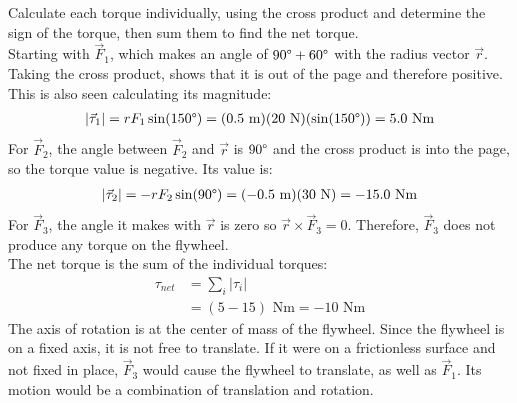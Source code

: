\documentclass[a4paper]{article}
\newcommand\m{\text{ m}}
\newcommand\Nm{\text{ Nm}}
\begin{document}
\begin{shaded}
\begin{center}
    \end{center}
    Calculate each torque individually, using the cross product and determine the sign of the torque, then sum them to find the net torque.
    \vspace{1mm}\\
    Starting with $\vec{F}_1$, which makes an angle of $90\degree + 60\degree$ with the radius vector $\vec{r}$. Taking the cross product, shows that it is out of the page and therefore positive. This is also seen calculating its magnitude:
    \begin{align*}
        |\vec{\tau}_1| = rF_1\sin(150\degree) = (0.5\m)(20\text{ N})(\sin(150\degree)) = 5.0\Nm
    \end{align*}
    For $\vec{F}_2$, the angle between $\vec{F}_2$ and $\vec{r}$ is $90\degree$ and the cross product is into the page, so the torque value is negative. Its value is:
    \begin{align*}
        |\vec{\tau}_2| = -rF_2\sin(90\degree) = (-0.5\m)(30\text{ N}) = -15.0\Nm
    \end{align*}
    For $\vec{F}_3$, the angle it makes with $\vec{r}$ is zero so $\vec{r}\times\vec{F}_3 = 0$. Therefore, $\vec{F}_3$ does not produce any torque on the flywheel.
    \vspace{1mm}\\
    The net torque is the sum of the individual torques:
    \begin{align*}
        \tau_{net} &= \sum_{i}|\tau_i|\\
        &= (5 - 15)\Nm = -10\Nm
    \end{align*}
    The axis of rotation is at the center of mass of the flywheel. Since the flywheel is on a fixed axis, it is not free to translate. If it were on a frictionless surface and not fixed in place, $\vec{F}_3$ would cause the flywheel to translate, as well as $\vec{F}_1$. Its motion would be a combination of translation and rotation.
\end{shaded}
\newpage
\end{document}

